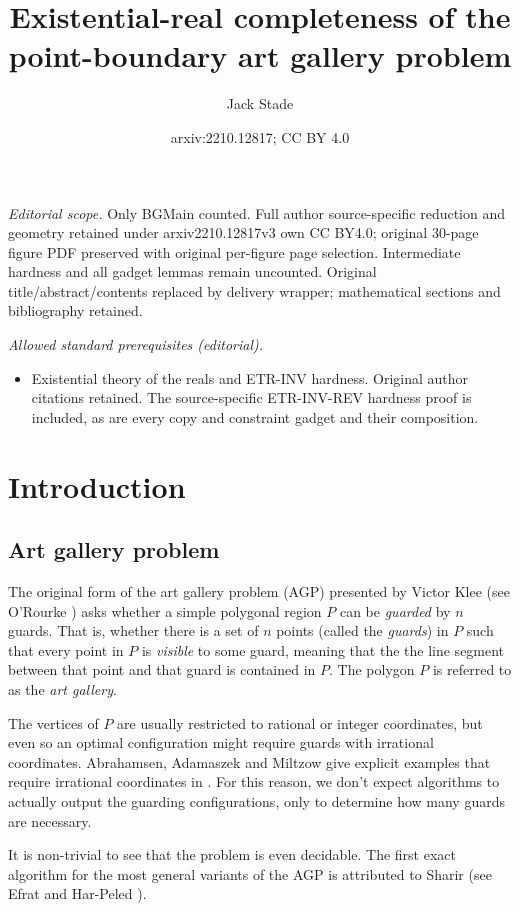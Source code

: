 \documentclass[11pt]{article}
\title{Existential-real completeness of the point-boundary art gallery problem}
\author{Jack Stade}
\date{arxiv:2210.12817; CC BY 4.0}
\theoremstyle{plain}
\theoremstyle{definition}
\numberwithin{theorem}{section}
\begin{document}
\maketitle
\noindent\textit{Editorial scope.} Only BGMain counted. Full author source-specific reduction and geometry retained under arxiv2210.12817v3 own CC BY4.0; original 30-page figure PDF preserved with original per-figure page selection. Intermediate hardness and all gadget lemmas remain uncounted. Original title/abstract/contents replaced by delivery wrapper; mathematical sections and bibliography retained.\par\medskip
\noindent\textit{Allowed standard prerequisites (editorial).}\begin{itemize}
\item Existential theory of the reals and ETR-INV hardness. Original author citations retained. The source-specific ETR-INV-REV hardness proof is included, as are every copy and constraint gadget and their composition.
\end{itemize}\medskip
\section{Introduction}
\subsection{Art gallery problem}
The original form of the art gallery problem (AGP) presented by Victor Klee (see O'Rourke \cite{ArtGalleryTextbook}) asks whether a simple polygonal region $P$ can be \emph{guarded} by $n$ guards. That is, whether there is a set of $n$ points (called the \emph{guards}) in $P$ such that every point in $P$ is \emph{visible} to some guard, meaning that the the line segment between that point and that guard is contained in $P$. The polygon $P$ is referred to as the \emph{art gallery}. 

The vertices of $P$ are usually restricted to rational or integer coordinates, but even so an optimal configuration might require guards with irrational coordinates. Abrahamsen, Adamaszek and Miltzow give explicit examples that require irrational coordinates in \cite{IrrationalGuards}. For this reason, we don't expect algorithms to actually output the guarding configurations, only to determine how many guards are necessary. 

It is non-trivial to see that the problem is even decidable. The first exact algorithm for the most general variants of the AGP is attributed to Sharir (see Efrat and Har-Peled \cite{FirstExact}). 
\end{document}
